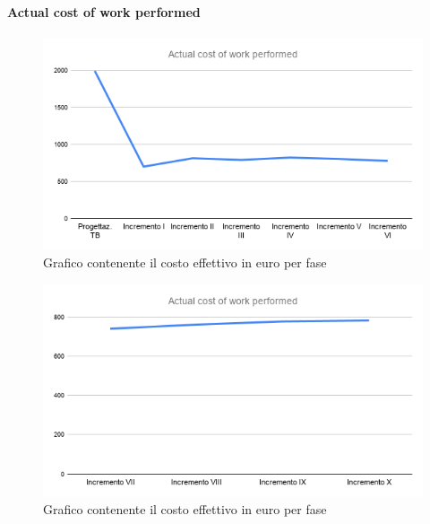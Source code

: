 	\paragraph{Actual cost of work performed}
		\begin{figure}[H]
			\centering
			\includegraphics[width=0.8\linewidth]{./res/images/ACWP_1.png}
			\caption{Grafico contenente il costo effettivo in euro per fase}
			\label{fig:Grafico contenente il costo effettivo in euro per fase}
		\end{figure}
		\begin{figure}[H]
			\centering
			\includegraphics[width=0.8\linewidth]{./res/images/ACWP_2.png}
			\caption{Grafico contenente il costo effettivo in euro per fase}
			\label{fig:Grafico contenente il costo effettivo in euro per fase}
		\end{figure}

